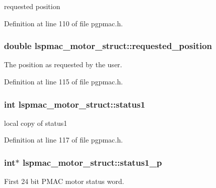 requested position 



Definition at line 110 of file pgpmac.\-h.

\hypertarget{structlspmac__motor__struct_af8cdc94c6e2478b12ce942d4cf1d7499}{
\subsubsection[{requested\-\_\-position}]{\setlength{\rightskip}{0pt plus 5cm}double lspmac\-\_\-motor\-\_\-struct\-::requested\-\_\-position}}\label{structlspmac__motor__struct_af8cdc94c6e2478b12ce942d4cf1d7499}


The position as requested by the user. 



Definition at line 115 of file pgpmac.\-h.

\hypertarget{structlspmac__motor__struct_acb52b612b9237e8eec0b97fb1e76a35d}{
\subsubsection[{status1}]{\setlength{\rightskip}{0pt plus 5cm}int lspmac\-\_\-motor\-\_\-struct\-::status1}}\label{structlspmac__motor__struct_acb52b612b9237e8eec0b97fb1e76a35d}


local copy of status1 



Definition at line 117 of file pgpmac.\-h.

\hypertarget{structlspmac__motor__struct_a56c41875faf19c643e97c10519e6eb8c}{
\subsubsection[{status1\-\_\-p}]{\setlength{\rightskip}{0pt plus 5cm}int$\ast$ lspmac\-\_\-motor\-\_\-struct\-::status1\-\_\-p}}\label{structlspmac__motor__struct_a56c41875faf19c643e97c10519e6eb8c}


First 24 bit P\-M\-A\-C motor status word. 




